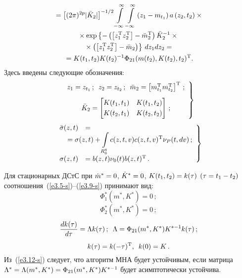 \begin{multicols}{2}
    \noindent
    \begin{multline}
    {}=
    \left[ (2\pi)^{2p} |\bar K_2|\right]^{-1/2}
    \int\limits_{-\infty}^\infty\int\limits_{-\infty}^\infty \left(z_1-m_{t_1}\right) a\left(z_2, t_2\right)\times{}\\
    {}\times
    \exp\left\{ - \left(\left[z_1^{\mathrm{T}} z_2^{\mathrm{T}}\right]-
    \bar m_2^{\mathrm{T}}\right)\bar K_2^{-1} \times{}\right.\\
\left.    {}\times
    \left(\left[z_1^{\mathrm{T}} z_2^{\mathrm{T}}\right]-
    \bar m_2\right)\right\}\, dz_1 dz_2={}\\
{}= K(t_1, t_2) K(t_2)^{-1} \Phi_{21} (m(t_2), K(t_2), t_2)^{\mathrm{T}}.
    \label{e3.7-s}
    \end{multline}
Здесь введены следующие обозначения:
    \begin{equation}
    \left.
    \begin{array}{c}
    z_1=z_{t_1}\,;\enskip
    z_2=z_{t_2}\,;\enskip \bar m_2 =\left[ m_{t_1}^{\mathrm{T}} m_{t_2}^{\mathrm{T}}\right]^{\mathrm{T}}\,;\\[9pt]
    \bar K_2 =\begin{bmatrix}
        K(t_1,t_1)&K(t_1, t_2)\\[3pt]
        K(t_2, t_1)& K(t_2, t_2)\end{bmatrix}\,;
        \end{array}
        \right\}
        \label{e3.8-s}
\end{equation}
    \begin{equation}
    \left.
    \begin{array}{rl}
    \bar \si (z,t) &={}\\
&\hspace*{-10mm}{}=\displaystyle
    \si(z,t) +\iii_{R_0^q} c(z,t,v) c(z,t,v)^{\mathrm{T}} \nu_P (t,dv)\,;
    \\[9pt]
     \si(z,t) &= b(z,t) \nu_0(t) b(z,t)^{\mathrm{T}}\,.
     \end{array}
     \right\}
    \label{e3.9-s}
    \end{equation}

Для стационарных ДСтС  при $\dot m^* \hm=0$, $\dot K^* \hm=0$,
$K(t_1, t_2)\hm= k(\tau)$
$(\tau\hm=t_1-t_2)$  соотношения~(\ref{e3.5-s})--(\ref{e3.9-s}) принимают вид:
    \begin{equation}
    \Phi_1^* (m^*, K^*) =0\,;\label{e3.10-s}
    \end{equation}
\begin{equation}
\Phi_2^*(m^*, K^*) =0\,;
\label{e3.11-s}
\end{equation}
\begin{equation}
\displaystyle\frac{\displaystyle dk(\tau)\mathstrut}{\displaystyle  d\tau\mathstrut} = \Lambda k(\tau)\,;\enskip
    \Lambda =\Phi_{21}(m^*, K^*) K^{*-1} k(\tau)\,;
    \label{e3.12-s}
    \end{equation}
    $$k(\tau) = k(-\tau)^{\mathrm{T}},\enskip k(0)=K\,.$$
Из~(\ref{e3.12-s}) следует, что алгоритм МНА будет устойчивым,
если матрица $\Lambda^* \hm= \Lambda (m^*, K^*)\hm=\Phi_{21}(m^*, K^*) K^{* -1}$
будет асимптотически устойчива.


\end{multicols}
